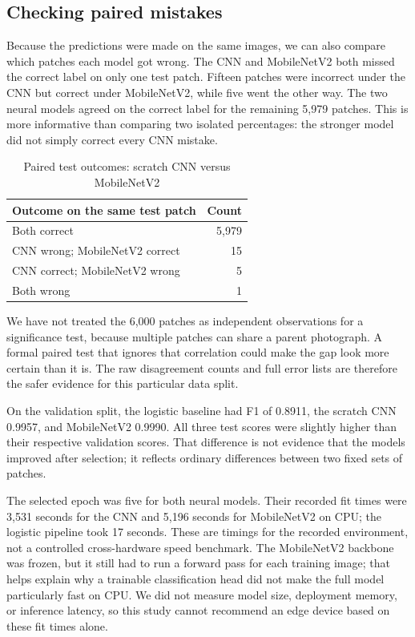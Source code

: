 \documentclass[conference,letterpaper]{IEEEtran}
\begin{document}
\subsection{Checking paired mistakes}
Because the predictions were made on the same images, we can also compare which patches each model got wrong. The CNN and MobileNetV2 both missed the correct label on only one test patch. Fifteen patches were incorrect under the CNN but correct under MobileNetV2, while five went the other way. The two neural models agreed on the correct label for the remaining 5,979 patches. This is more informative than comparing two isolated percentages: the stronger model did not simply correct every CNN mistake.

\begin{table}[!t]
\centering
\caption{Paired test outcomes: scratch CNN versus MobileNetV2}
\label{tab:paired}
\footnotesize
\begin{tabular}{lr}
\toprule
Outcome on the same test patch & Count \\
\midrule
Both correct & 5,979 \\
CNN wrong; MobileNetV2 correct & 15 \\
CNN correct; MobileNetV2 wrong & 5 \\
Both wrong & 1 \\
\bottomrule
\end{tabular}
\end{table}

We have not treated the 6,000 patches as independent observations for a significance test, because multiple patches can share a parent photograph. A formal paired test that ignores that correlation could make the gap look more certain than it is. The raw disagreement counts and full error lists are therefore the safer evidence for this particular data split.

On the validation split, the logistic baseline had F1 of 0.8911, the scratch CNN 0.9957, and MobileNetV2 0.9990. All three test scores were slightly higher than their respective validation scores. That difference is not evidence that the models improved after selection; it reflects ordinary differences between two fixed sets of patches.

The selected epoch was five for both neural models. Their recorded fit times were 3,531 seconds for the CNN and 5,196 seconds for MobileNetV2 on CPU; the logistic pipeline took 17 seconds. These are timings for the recorded environment, not a controlled cross-hardware speed benchmark. The MobileNetV2 backbone was frozen, but it still had to run a forward pass for each training image; that helps explain why a trainable classification head did not make the full model particularly fast on CPU. We did not measure model size, deployment memory, or inference latency, so this study cannot recommend an edge device based on these fit times alone.
\end{document}
